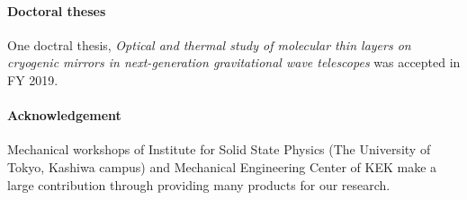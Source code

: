 \paragraph*{\bi Doctoral theses}

One doctral thesis, {\it Optical and thermal study of molecular thin layers on cryogenic mirrors in next-generation gravitational wave telescopes} was accepted in FY 2019. 

\paragraph*{\bi Acknowledgement}

Mechanical workshops of Institute for Solid State Physics (The University of Tokyo, Kashiwa campus) and Mechanical Engineering Center of KEK make a large contribution through providing many products for our research.